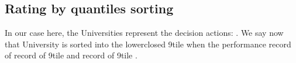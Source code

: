 \documentclass[a4paper,12pt,english]{sphinxhowto}
\begin{document}
\subsection{Rating by quantiles sorting}
\label{\detokenize{tutorial:rating-by-quantiles-sorting}}
In our case here, the Universities represent the decision actions: . We say now that University  is sorted into the lower\sphinxhyphen{}closed 9\sphinxhyphen{}tile  when the performance record of   record of 9\sphinxhyphen{}tile  and   record of 9\sphinxhyphen{}tile .
\def\sphinxLiteralBlockLabel{\label{\detokenize{tutorial:ninetilessorting}}}
\end{document}

